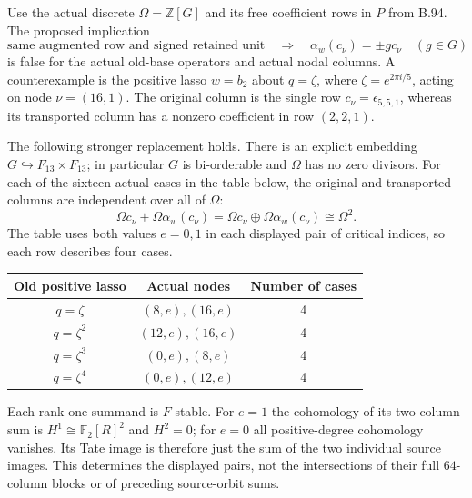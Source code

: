 \label{stmt:B98}
Use the actual discrete $\Omega=\mathbb Z[G]$ and its free coefficient
rows in $P$ from B.94.  The proposed implication
\[
 \text{same augmented row and signed retained unit}
 \quad\Longrightarrow\quad
 \alpha_w(c_\nu)=\pm g c_\nu\quad(g\in G)
\]
is false for the actual old-base operators and actual nodal columns.
A counterexample is the positive lasso $w=b_2$ about $q=\zeta$,
where $\zeta=e^{2\pi i/5}$, acting on node $\nu=(16,1)$.
The original column is the single row
$c_\nu=\epsilon_{5,5,1}$, whereas its transported column has
a nonzero coefficient in row $(2,2,1)$.

The following stronger replacement holds.  There is an explicit
embedding $G\hookrightarrow F_{13}\times F_{13}$; in particular
$G$ is bi-orderable and $\Omega$ has no zero divisors.  For each
of the sixteen actual cases in the table below, the original
and transported columns are independent over all of $\Omega$:
\begin{equation}\label{eq:B98-pair}
 \Omega c_\nu+\Omega\alpha_w(c_\nu)
       =\Omega c_\nu\oplus\Omega\alpha_w(c_\nu)
       \cong\Omega^2.
\end{equation}
The table uses both values $e=0,1$ in each displayed pair of
critical indices, so each row describes four cases.
\begin{center}
\begin{tabular}{ccc}
Old positive lasso&Actual nodes&Number of cases\\\hline
$q=\zeta$&$(8,e),(16,e)$&4\\
$q=\zeta^2$&$(12,e),(16,e)$&4\\
$q=\zeta^3$&$(0,e),(8,e)$&4\\
$q=\zeta^4$&$(0,e),(12,e)$&4
\end{tabular}
\end{center}
Each rank-one summand is $F$-stable.  For $e=1$ the cohomology
of its two-column sum is $H^1\cong\mathbb F_2[R]^2$ and $H^2=0$;
for $e=0$ all positive-degree cohomology vanishes.  Its Tate image
is therefore just the sum of the two individual source images.
This determines the displayed pairs, not the intersections of
their full $64$-column blocks or of preceding source-orbit sums.

